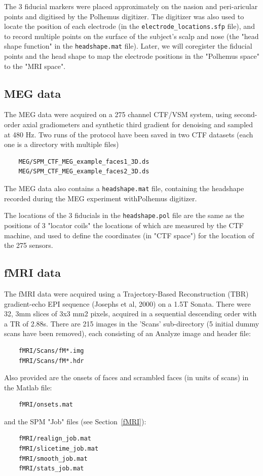 The 3 fiducial markers were placed approximately on the nasion and peri-aricular points and digitised by the Polhemus digitizer. The digitizer was also used to locate the position of each electrode (in the \verb!electrode_locations.sfp! file), and to record multiple points on the surface of the  subject's scalp and nose (the "head shape function" in the \verb!headshape.mat! file). Later, we will coregister the fiducial points and the head shape to map the electrode positions in the "Polhemus space" to the "MRI space".

\subsection{MEG data \label{meg}}

The MEG data were acquired on a 275 channel CTF/VSM system, using second-order axial gradiometers and synthetic third gradient for denoising and sampled at 480 Hz. Two runs of the protocol have been saved in two CTF datasets (each one is a directory with multiple files) 
\begin{verbatim}
    MEG/SPM_CTF_MEG_example_faces1_3D.ds
    MEG/SPM_CTF_MEG_example_faces2_3D.ds
\end{verbatim}
The MEG data also contains a \verb!headshape.mat! file, containing the headshape recorded during the MEG experiment withPolhemus digitizer.

The locations of the 3 fiducials in the \verb!headshape.pol! file are the same as the positions of 3 "locator coils" the locations of which are measured by the CTF machine, and used to define the coordinates (in "CTF space") for the location of the 275 sensors.

\subsection{fMRI data}

The fMRI data were acquired using a Trajectory-Based Reconstruction (TBR) gradient-echo EPI sequence (Josephs et al, 2000) on a 1.5T Sonata. There were 32, 3mm slices of 3x3 mm2 pixels, acquired in a sequential descending order with a TR of 2.88s. There are 215 images in the 'Scans' sub-directory (5 initial dummy scans have been removed), each consisting of an Analyze image and header file:
\begin{verbatim}
    fMRI/Scans/fM*.img  
    fMRI/Scans/fM*.hdr
\end{verbatim}
Also provided are the onsets of faces and scrambled faces (in units of scans) in the Matlab file:
\begin{verbatim}
    fMRI/onsets.mat 
\end{verbatim}
and the SPM "Job" files (see Section~\ref{fMRI}):
\begin{verbatim}
    fMRI/realign_job.mat
    fMRI/slicetime_job.mat
    fMRI/smooth_job.mat
    fMRI/stats_job.mat
\end{verbatim}

